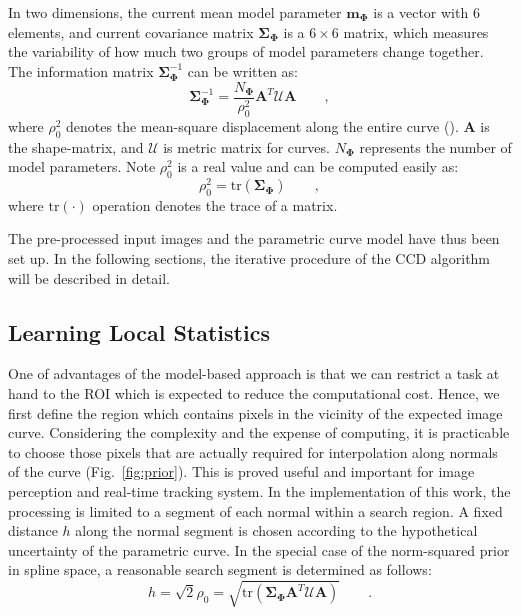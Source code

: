 \documentclass[conference]{IEEEtran}
\begin{document}
In two dimensions, the current mean model parameter
$\mathbf{m}_{\mathbf{\Phi}}$ is a vector with $6$ elements, and current
covariance matrix $\mathbf{\Sigma}_{\mathbf{\Phi}}$ is a $6 \times 6$ matrix, which measures the variability of
how much two groups of model parameters change together. The
information matrix $\mathbf{\Sigma}_{\mathbf{\Phi}}^{-1}$ can be
written as:
\begin{equation}
  \label{eq:infomatrix}
  \mathbf{\Sigma}_{\mathbf{\Phi}}^{-1} = \frac{N_{\mathbf{\Phi}}}{\rho_0^2} \mathbf{A}^T\mathcal{U}\mathbf{A}\qquad,
\end{equation}
where $\rho_0^2$ denotes the mean-square displacement along the entire
curve (\cite{blake1998active}). $\mathbf{A}$ is the shape-matrix, and $\mathcal{U}$ is
metric matrix for curves. $N_{\mathbf{\Phi}}$ represents
the number of model parameters. Note $\rho_0^2$
is a real value and can be computed easily as:
\begin{equation}
  \label{eq:trace}
  \rho_0^2 = \mathrm{tr}(\mathbf{\Sigma}_{\mathbf{\Phi}})\qquad,
\end{equation}
where $\mathrm{tr}(\cdot)$ operation denotes the trace of a matrix.

The pre-processed input images and the parametric curve model have
thus been set up. In the following sections, the iterative procedure of the
CCD algorithm will be described in detail.

\subsection{Learning Local Statistics}
One of advantages of the
model-based approach is that we can restrict a task at hand to the ROI
which is
expected to reduce the computational cost. Hence, we first define
the region which contains pixels in the vicinity of the expected image
curve. Considering the complexity and the expense of computing, it is practicable
to choose those pixels that are actually required for interpolation along
normals of the curve (Fig.~\ref{fig:prior}). This is proved useful and important for image
perception and real-time tracking system. In the implementation of
this work, the processing is limited to a segment of each normal within
a search region. A fixed distance $h$ along the normal segment is
chosen according to the hypothetical uncertainty of the parametric curve. In the
special case of the norm-squared prior in spline space, a reasonable
search segment is determined as follows:
\begin{equation}
  \label{eq:radius}
  h = \sqrt{2} \rho_0 = \sqrt{\mathrm{tr}(\mathbf{\Sigma}_{\mathbf{\Phi}}\mathbf{A}^T\mathcal{U}\mathbf{A})}\qquad.
\end{equation}
\end{document}
